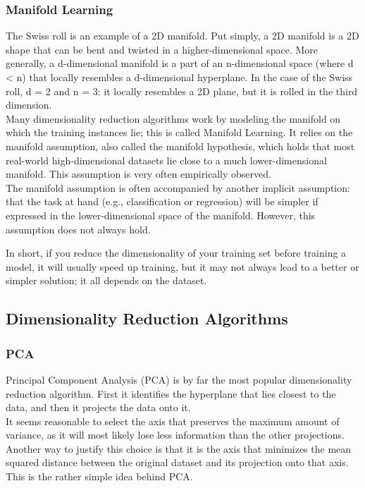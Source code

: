 \documentclass[french]{article}
\begin{document}
\subsubsection{Manifold Learning}

The Swiss roll is an example of a 2D manifold. Put simply, a 2D manifold is a 2D shape that can be bent and twisted in a higher-dimensional space. More generally, a d-dimensional manifold is a part of an n-dimensional space (where d < n) that locally resembles a d-dimensional hyperplane. In the case of the Swiss roll, d = 2 and n = 3: it locally resembles a 2D plane, but it is rolled in the third dimension. \\

Many dimensionality reduction algorithms work by modeling the manifold on which the training instances lie; this is called Manifold Learning. It relies on the manifold assumption, also called the manifold hypothesis, which holds that most real-world high-dimensional datasets lie close to a much lower-dimensional manifold. This assumption is very often empirically observed.\\

The manifold assumption is often accompanied by another implicit assumption: that the task at hand (e.g., classification or regression) will be simpler if expressed in the lower-dimensional space of the manifold. However, this assumption does not always hold.

In short, if you reduce the dimensionality of your training set before training a model, it will usually speed up training, but it may not always lead to a better or simpler solution; it all depends on the dataset.

\subsection{Dimensionality Reduction Algorithms}

\subsubsection{PCA}

Principal Component Analysis (PCA) is by far the most popular dimensionality reduction algorithm. First it identifies the hyperplane that lies closest to the data, and then it projects the data onto it.\\

It seems reasonable to select the axis that preserves the maximum amount of variance, as it will most likely lose less information than the other projections. Another way to justify this choice is that it is the axis that minimizes the mean squared distance between the original dataset and its projection onto that axis. This is the rather simple idea behind PCA.\\
\end{document}
